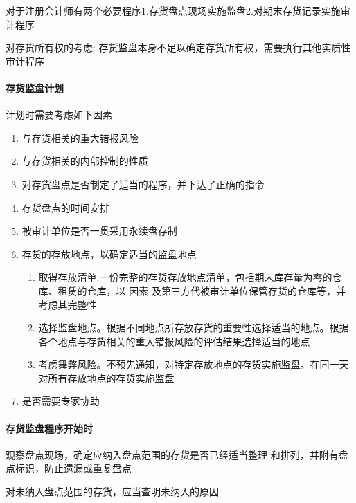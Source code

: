 \documentclass[UTF8,12pt]{ctexart}
\numberwithin{equation}{section} %
\numberwithin{figure}{section}
\numberwithin{table}{section}
\begin{document}
	对于注册会计师有两个必要程序1.存货盘点现场实施监盘2.对期末存货记录实施审计程序
	
	对存货所有权的考虑: 存货监盘本身不足以确定存货所有权，需要执行其他实质性审计程序
	
	\paragraph{存货监盘计划}
	计划时需要考虑如下因素
	\begin{enumerate}
		\item 与存货相关的重大错报风险  
		
		\item 与存货相关的内部控制的性质 
		
		\item 对存货盘点是否制定了适当的程序，并下达了正确的指令  
		
		\item 存货盘点的时间安排 
		
		\item 被审计单位是否一贯采用永续盘存制
		
		\item 存货的存放地点，以确定适当的监盘地点
		\begin{enumerate}
			\item 取得存放清单:一份完整的存货存放地点清单，包括期末库存量为零的仓库、租赁的仓库，以 因素 及第三方代被审计单位保管存货的仓库等，并考虑其完整性
			
			\item 选择监盘地点。根据不同地点所存放存货的重要性选择适当的地点。根据各个地点与存货相关的重大错报风险的评估结果选择适当的地点
			
			\item 考虑舞弊风险。不预先通知，对特定存放地点的存货实施监盘。在同一天对所有存放地点的存货实施监盘
		\end{enumerate}
		
		\item 是否需要专家协助
	\end{enumerate}
	
	\paragraph{存货监盘程序开始时}
	观察盘点现场，确定应纳入盘点范围的存货是否已经适当整理 和排列，并附有盘点标识，防止遗漏或重复盘点 
	
	对未纳入盘点范围的存货，应当查明未纳入的原因
	
\end{document}
